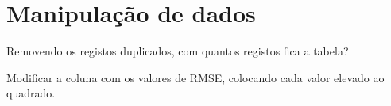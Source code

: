 \documentclass{exam}
\begin{document}
\section*{Manipulação de dados}

\begin{questions}
	\question Removendo os registos duplicados, com quantos registos fica a tabela?
	
	\question Modificar a coluna com os valores de RMSE, colocando cada valor elevado ao quadrado.
\end{questions}
\end{document}
